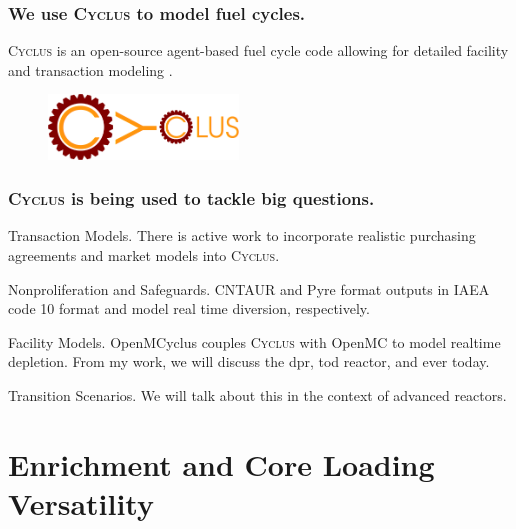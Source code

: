 \documentclass[9pt]{beamer}
\newcommand{\cyclus}{\textsc{Cyclus}\xspace}
\begin{document}
  \begin{frame}
    \frametitle{We use \cyclus to model fuel cycles.}
    \vspace{20pt}
    \cyclus is an open-source agent-based fuel cycle code allowing for detailed facility and transaction modeling \cite{huff_fundamental_2016}.
    \vspace{30pt}
    \begin{figure}
        \centering
        \includegraphics[width=0.45\textwidth]{images/cyclus_logo.png}
    \end{figure}
  \end{frame}

  \begin{frame}
    \frametitle{\cyclus is being used to tackle big questions.}
    \begin{block}{Transaction Models.}
        There is active work to incorporate realistic purchasing agreements and market models into \cyclus.
    \end{block}
    \begin{block}{Nonproliferation and Safeguards.}
        CNTAUR \cite{mummah_advanced_2024} and Pyre \cite{westphal_modeling_2019} format outputs in IAEA code 10 format and model real time diversion, respectively.
    \end{block}
    \begin{block}{Facility Models.}
      OpenMCyclus \cite{openmcyclus_paper} couples \cyclus with OpenMC to model realtime depletion. From my work, we will discuss the \gls{dpr}, \gls{tod} reactor, and \gls{ever} today.
  \end{block}
    \begin{block}{Transition Scenarios.}
        We will talk about this in the context of advanced reactors.
    \end{block}
  \end{frame}

\section{Enrichment and Core Loading Versatility}
\end{document}
